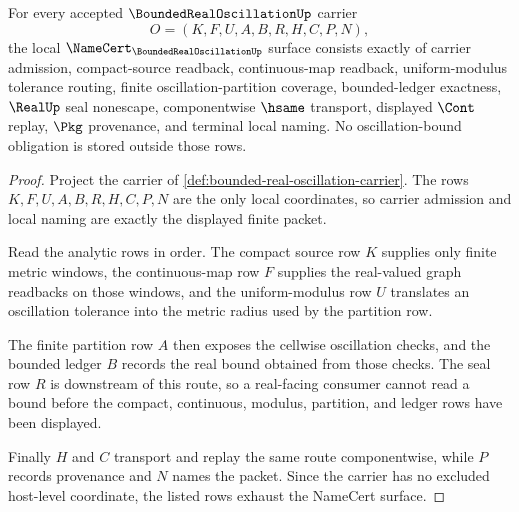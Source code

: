 \begin{theorem}
\label{thm:bounded-real-oscillation-namecert-obligations}
For every accepted $\BoundedRealOscillationUp$ carrier
$$
O=(K,F,U,A,B,R,H,C,P,N),
$$
the local $\NameCert_{\BoundedRealOscillationUp}$ surface consists exactly of carrier admission, compact-source readback, continuous-map readback, uniform-modulus tolerance routing, finite oscillation-partition coverage, bounded-ledger exactness, $\RealUp$ seal nonescape, componentwise $\hsame$ transport, displayed $\Cont$ replay, $\Pkg$ provenance, and terminal local naming. No oscillation-bound obligation is stored outside those rows.
\end{theorem}
\begin{proof}
Project the carrier of \autoref{def:bounded-real-oscillation-carrier}. The rows $K,F,U,A,B,R,H,C,P,N$ are the only local coordinates, so carrier admission and local naming are exactly the displayed finite packet.

Read the analytic rows in order. The compact source row $K$ supplies only finite metric windows, the continuous-map row $F$ supplies the real-valued graph readbacks on those windows, and the uniform-modulus row $U$ translates an oscillation tolerance into the metric radius used by the partition row.

The finite partition row $A$ then exposes the cellwise oscillation checks, and the bounded ledger $B$ records the real bound obtained from those checks. The seal row $R$ is downstream of this route, so a real-facing consumer cannot read a bound before the compact, continuous, modulus, partition, and ledger rows have been displayed.

Finally $H$ and $C$ transport and replay the same route componentwise, while $P$ records provenance and $N$ names the packet. Since the carrier has no excluded host-level coordinate, the listed rows exhaust the NameCert surface.
\end{proof}

